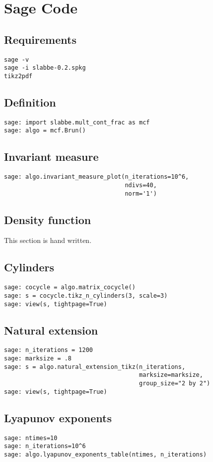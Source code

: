 \section{Sage Code}
\subsection{Requirements}
\begin{verbatim}
sage -v
sage -i slabbe-0.2.spkg
tikz2pdf
\end{verbatim}
\subsection{Definition}
\begin{verbatim}
sage: import slabbe.mult_cont_frac as mcf
sage: algo = mcf.Brun()
\end{verbatim}
\subsection{Invariant measure}
\begin{verbatim}
sage: algo.invariant_measure_plot(n_iterations=10^6,
                                  ndivs=40,
                                  norm='1')
\end{verbatim}
\subsection{Density function}
This section is hand written.
\subsection{Cylinders}
\begin{verbatim}
sage: cocycle = algo.matrix_cocycle()
sage: s = cocycle.tikz_n_cylinders(3, scale=3)
sage: view(s, tightpage=True)
\end{verbatim}
\subsection{Natural extension}
\begin{verbatim}
sage: n_iterations = 1200
sage: marksize = .8
sage: s = algo.natural_extension_tikz(n_iterations, 
                                      marksize=marksize,
                                      group_size="2 by 2")
sage: view(s, tightpage=True)
\end{verbatim}
\subsection{Lyapunov exponents}
\begin{verbatim}
sage: ntimes=10 
sage: n_iterations=10^6
sage: algo.lyapunov_exponents_table(ntimes, n_iterations)
\end{verbatim}
